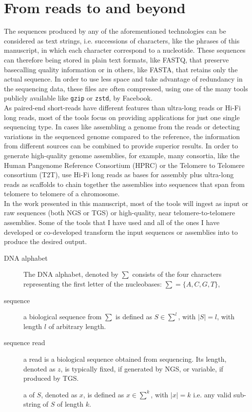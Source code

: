 \section{From reads to \kmers and beyond}
\label{sec:kmer}
The sequences produced by any of the aforementioned technologies can be considered as text strings, i.e. successions of characters, like the phrases of this manuscript, in which each character correspond to a nucleotide. These sequences can therefore being stored in plain text formats, like FASTQ, that preserve basecalling quality information or in others, like FASTA, that retains only the actual sequence. In order to use less space and take advantage of redundancy in the sequencing data, these files are often compressed, using one of the many tools publicly available like \texttt{gzip} or \texttt{zstd}, by Facebook.\\
As paired-end short-reads have different features than ultra-long reads or Hi-Fi long reads, most of the tools focus on providing applications for just one single sequencing type. In cases like assembling a genome from the reads or detecting variations in the sequenced genome compared to the reference, the information from different sources can be combined to provide superior results. In order to generate high-quality genome assemblies, for example, many consortia, like the Human Pangenome Reference Consortium (\gls{HPRC}) or the Telomere to Telomere consortium (\gls{T2T}), use Hi-Fi long reads as bases for assembly plus ultra-long reads as scaffolds to chain together the assemblies into sequences that span from telomere to telomere of a chromosome.\\
In the work presented in this manuscript, most of the tools will ingest as input or raw sequences (both NGS or TGS) or high-quality, near telomere-to-telomere assemblies. Some of the tools that I have used and all of the ones I have developed or co-developed transform the input sequences or assemblies into \kmers to produce the desired output. \\
\begin{description}
	\item[DNA alphabet] The DNA alphabet, denoted by $\sum$ consists of the four characters representing the first letter of the nucleobases: $ \sum = \{A, C, G, T\}$, 
	\item[sequence] a biological sequence from $\sum$ is defined as $ S \in \sum^{l}$, with $\lvert S \rvert = l $, with length $l$ of arbitrary length.
	\item[sequence read] a read is a biological sequence obtained from sequencing. Its length, denoted as $z$, is typically fixed, if generated by NGS, or variable, if produced by TGS.
	\item[\kmer] a \kmer of $S$, denoted as $x$, is defined as $ x \in \sum^{k}$, with $\lvert x \rvert = k $ i.e. any valid sub-string of $S$ of length $k$. 
\end{description}
